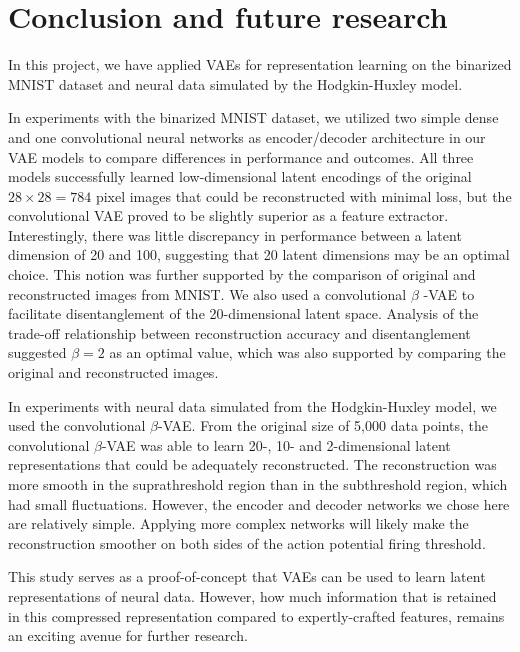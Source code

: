 \section{Conclusion and future research}\label{sec:Conclusion}
In this project, we have applied VAEs for representation learning on the binarized MNIST dataset and neural data simulated by the Hodgkin-Huxley model. 

In experiments with the binarized MNIST dataset, we utilized two simple dense and one convolutional neural networks as encoder/decoder architecture in our VAE models to compare differences in performance and outcomes. All three models successfully learned low-dimensional latent encodings of the original $28 \times 28 = 784$ pixel images that could be reconstructed with minimal loss, but the convolutional VAE proved to be slightly superior as a feature extractor. Interestingly, there was little discrepancy in performance between a latent dimension of 20 and 100, suggesting that 20 latent dimensions may be an optimal choice. This notion was further supported by the comparison of original and reconstructed images from MNIST. We also used a convolutional $\beta$ -VAE to facilitate disentanglement of the 20-dimensional latent space. Analysis of the trade-off relationship between reconstruction accuracy and disentanglement suggested $\beta=2$ as an optimal value, which was also supported by comparing the original and reconstructed images.

In experiments with neural data simulated from the Hodgkin-Huxley model, we used the convolutional $\beta$-VAE. From the original size of 5,000 data points, the convolutional $\beta$-VAE was able to learn 20-, 10- and 2-dimensional latent representations that could be adequately reconstructed. The reconstruction was more smooth in the suprathreshold region than in the subthreshold region, which had small fluctuations. However, the encoder and decoder networks we chose here are relatively simple. Applying more complex networks will likely make the reconstruction smoother on both sides of the action potential firing threshold. 

This study serves as a proof-of-concept that VAEs can be used to learn latent representations of neural data. However, how much information that is retained in this compressed representation compared to expertly-crafted features, remains an exciting avenue for further research.

